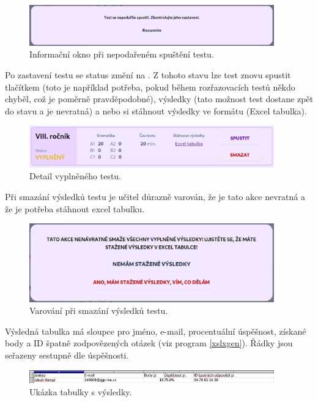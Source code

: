 \begin{figure}[H]
    \centering
    \includegraphics[width=400px]{images/01design/unable-to-run-test.png}
    \caption{Informační okno při nepodařeném spuštění testu.}
\end{figure}

Po zastavení testu se status změní na . Z tohoto stavu lze test znovu spustit tlačítkem  (toto je například potřeba, pokud během rozřazovacích testů někdo chyběl, což je poměrně pravděpodobné),  výsledky (tato možnost test dostane zpět do stavu  a je nevratná) a nebo si stáhnout výsledky ve formátu  (Excel tabulka).

\begin{figure}[H]
    \centering
    \includegraphics[width=400px]{images/01design/test-filled.png}
    \caption{Detail vyplněného testu.}
\end{figure}

Při smazání výsledků testu je učitel důrazně varován, že je tato akce nevratná a že je potřeba stáhnout excel tabulku.

\begin{figure}[H]
    \centering
    \includegraphics[width=400px]{images/01design/test-deletion.png}
    \caption{Varování při smazání výsledků testu.}
\end{figure}

Výsledná tabulka má sloupce pro jméno, e-mail, procentuální úspěšnost, získané body a ID špatně zodpovězených otázek (viz program \ref{xslxgen}). Řádky jsou seřazeny sestupně dle úspěšnosti.

\begin{figure}[H]
    \centering
    \includegraphics[width=400px]{images/01design/excel.png}
    \caption{Ukázka tabulky s výsledky.}
\end{figure}

